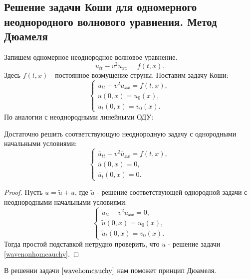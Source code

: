 % 

\subsection{Решение задачи Коши для одномерного неоднородного волнового уравнения. Метод Дюамеля}
Запишем одномерное неоднородное волновое уравнение.
\begin{equation*}
	u_{tt} - v^2 u_{xx} = f(t,x).
\end{equation*}
Здесь $f(t,x)$ - постоянное возмущение струны. Поставим задачу Коши:
\begin{equation}
	\begin{cases}
		u_{tt} - v^2 u_{xx} = f(t,x), \\
		u(0,x) = u_0(x), \\
		u_t(0,x) = v_0(x).
	\end{cases}
\label{wavenonhomcauchy}
\end{equation}
По аналогии с неоднородными линейными ОДУ:
\begin{note} Достаточно решить соответствующую неоднородную задачу с однородными начальными условиями:
\begin{equation}
	\begin{cases}
		\overline{u}_{tt} - v^2 \overline{u}_{xx} = f(t,x), \\
		\overline{u}(0,x) = 0, \\
		\overline{u}_t(0,x) = 0.
	\end{cases}
\label{wavehomcauchy}
\end{equation}
\end{note}
\begin{proof}
Пусть $u = \widetilde{u} + \overline{u}$, где $\widetilde{u}$ - решение соответствующей однородной задачи с неоднородными начальными условиями:
\begin{equation*}
	\begin{cases}
		\widetilde{u}_{tt} - v^2 \widetilde{u}_{xx} = 0, \\
		\widetilde{u}(0,x) = u_0(x), \\
		\widetilde{u}_t(0,x) = v_0(x).
	\end{cases}
\end{equation*}
Тогда простой подставкой нетрудно проверить, что $u$ - решение задачи \eqref{wavenonhomcauchy}.

\end{proof}
В решении задачи $\eqref{wavehomcauchy}$ нам поможет принцип Дюамеля.
